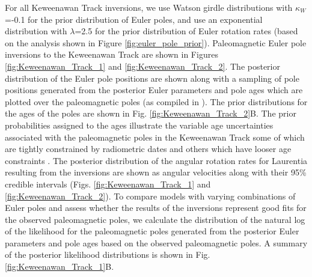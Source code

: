 \documentclass[]{agujournal2019}
\providecommand{\DIFadd}[1]{{\protect\color{blue}\uwave{#1}}} %
\providecommand{\DIFaddbegin}{} %
\providecommand{\DIFaddend}{} %
\begin{document}
For all Keweenawan Track inversions, we use \DIFaddbegin \DIFadd{weakly informative }\DIFaddend Watson girdle distributions with $\kappa_W$=-0.1 for the prior distribution of Euler poles, and use an exponential distribution with $\lambda$=2.5 for the prior distribution of Euler rotation rates (based on the analysis shown in Figure \ref{fig:euler_pole_prior}). Paleomagnetic Euler pole inversions to the Keweenawan Track are shown in Figures \ref{fig:Keweenawan_Track_1} and \ref{fig:Keweenawan_Track_2}. The posterior distribution of the Euler pole positions are shown along with a sampling of pole positions generated from the posterior Euler parameters and pole ages which are plotted over the paleomagnetic poles (as compiled in ). The prior distributions for the ages of the poles are shown in Fig. \ref{fig:Keweenawan_Track_2}B. The prior probabilities assigned to the ages illustrate the variable age uncertainties associated with the paleomagnetic poles in the Keweenawan Track some of which are tightly constrained by radiometric dates and others which have looser age constraints \cite{Swanson-Hysell2019a}. The posterior distribution of the angular rotation rates for Laurentia resulting from the inversions are shown as angular velocities along with their 95\% credible intervals (Figs. \ref{fig:Keweenawan_Track_1} and \ref{fig:Keweenawan_Track_2}). To compare models with varying combinations of Euler poles and assess whether the results of the inversions represent good fits for the observed paleomagnetic poles, we calculate the distribution of the natural log of the likelihood for the paleomagnetic poles generated from the posterior Euler parameters and pole ages based on the observed paleomagnetic poles. A summary of the posterior likelihood distributions is shown in Fig. \ref{fig:Keweenawan_Track_1}B. 
\end{document}
